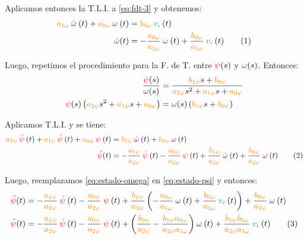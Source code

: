 Aplicamos entonces la T.L.I. a \eqref{eq:fdt-3} y obtenemos:
\begin{align}
  \nara{a_{1\omega}}\mora{\dot\omega} (t) + \nara{a_{0\omega}}\mora{\omega} (t) &= \nara{b_{0\omega}}\verd{v_{i}} (t) \\
  \mora{\dot\omega} (t) &= -\frac{\nara{a_{0\omega}}}{\nara{a_{1\omega}}}\mora{\omega} (t) + \frac{\nara{b_{0\omega}}}{\nara{a_{1\omega}}}\verd{v_{i}} (t)
  \stepcounter{equation}\tag{\theequation}\label{eq:estado-omega}
\end{align}

Luego, repetimos el procedimiento para la F. de T. entre $\mathbin{\color{red}\psi} (s)$ y $\mathbin{\color{violet}\omega} (s)$.
Entonces:
\begin{align}
  \frac{\rojo{\psi} (s)}{\mora{\omega} (s)} &= \frac{\nara{b_{1\psi}}s + \nara{b_{0\psi}}}
    {\nara{a_{2\psi}}s^{2} + \nara{a_{1\psi}}s + \nara{a_{0\psi}}} \\
  \rojo{\psi} (s) \left(\nara{a_{2\psi}}s^{2} + \nara{a_{1\psi}}s + \nara{a_{0\psi}}\right) &=
    \mora{\omega} (s) \left(\nara{b_{1\psi}}s + \nara{b_{0\psi}}\right)
\end{align}

Aplicamos T.L.I. y se tiene:
\begin{align}
  \nara{a_{2\psi}}\rojo{\ddot\psi} (t) + \nara{a_{1\psi}}\rojo{\dot\psi} (t) + \nara{a_{0\psi}}\rojo{\psi} (t) &=
    \nara{b_{1\psi}}\mora{\dot\omega} (t) + \nara{b_{0\psi}}\mora{\omega} (t) \\
  \rojo{\ddot\psi} (t) &= -\frac{\nara{a_{1\psi}}}{\nara{a_{2\psi}}}\rojo{\dot\psi} (t) -
    \frac{\nara{a_{0\psi}}}{\nara{a_{2\psi}}}\rojo{\psi} (t) + \frac{\nara{b_{1\psi}}}{\nara{a_{2\psi}}}\mora{\dot\omega} (t) +
    \frac{\nara{b_{0\psi}}}{\nara{a_{2\psi}}}\mora{\omega} (t)
  \stepcounter{equation}\tag{\theequation}\label{eq:estado-psi}
\end{align}

Luego, reemplazamos \eqref{eq:estado-omega} en \eqref{eq:estado-psi} y entonces:
\begin{align}
  \rojo{\ddot\psi} (t) &= -\frac{\nara{a_{1\psi}}}{\nara{a_{2\psi}}}\rojo{\dot\psi} (t) -
    \frac{\nara{a_{0\psi}}}{\nara{a_{2\psi}}}\rojo{\psi} (t) +
    \frac{\nara{b_{1\psi}}}{\nara{a_{2\psi}}}\left(-\frac{\nara{a_{0\omega}}}{\nara{a_{1\omega}}}\mora{\omega} (t) + \frac{\nara{b_{0\omega}}}{\nara{a_{1\omega}}}\verd{v_{i}} (t)\right) +
    \frac{\nara{b_{0\psi}}}{\nara{a_{2\psi}}}\mora{\omega} (t) \\
  \rojo{\ddot\psi} (t) &= -\frac{\nara{a_{1\psi}}}{\nara{a_{2\psi}}}\rojo{\dot\psi} (t) -
    \frac{\nara{a_{0\psi}}}{\nara{a_{2\psi}}}\rojo{\psi} (t) +
    \left(\frac{\nara{b_{0\psi}}}{\nara{a_{2\psi}}} - \frac{\nara{b_{1\psi}}\nara{a_{0\omega}}}{\nara{a_{2\psi}}\nara{a_{1\omega}}}\right) \mora{\omega} (t) +
    \frac{\nara{b_{1\psi}}\nara{b_{0\omega}}}{\nara{a_{2\psi}}\nara{a_{1\omega}}} \verd{v_{i}} (t)
  \stepcounter{equation}\tag{\theequation}\label{eq:estado-psi-2}
\end{align}

